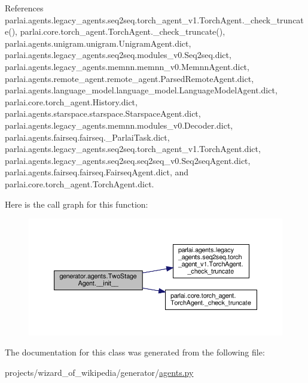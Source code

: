 References parlai.\+agents.\+legacy\+\_\+agents.\+seq2seq.\+torch\+\_\+agent\+\_\+v1.\+Torch\+Agent.\+\_\+check\+\_\+truncate(), parlai.\+core.\+torch\+\_\+agent.\+Torch\+Agent.\+\_\+check\+\_\+truncate(), parlai.\+agents.\+unigram.\+unigram.\+Unigram\+Agent.\+dict, parlai.\+agents.\+legacy\+\_\+agents.\+seq2seq.\+modules\+\_\+v0.\+Seq2seq.\+dict, parlai.\+agents.\+legacy\+\_\+agents.\+memnn.\+memnn\+\_\+v0.\+Memnn\+Agent.\+dict, parlai.\+agents.\+remote\+\_\+agent.\+remote\+\_\+agent.\+Parsed\+Remote\+Agent.\+dict, parlai.\+agents.\+language\+\_\+model.\+language\+\_\+model.\+Language\+Model\+Agent.\+dict, parlai.\+core.\+torch\+\_\+agent.\+History.\+dict, parlai.\+agents.\+starspace.\+starspace.\+Starspace\+Agent.\+dict, parlai.\+agents.\+legacy\+\_\+agents.\+memnn.\+modules\+\_\+v0.\+Decoder.\+dict, parlai.\+agents.\+fairseq.\+fairseq.\+\_\+\+Parlai\+Task.\+dict, parlai.\+agents.\+legacy\+\_\+agents.\+seq2seq.\+torch\+\_\+agent\+\_\+v1.\+Torch\+Agent.\+dict, parlai.\+agents.\+legacy\+\_\+agents.\+seq2seq.\+seq2seq\+\_\+v0.\+Seq2seq\+Agent.\+dict, parlai.\+agents.\+fairseq.\+fairseq.\+Fairseq\+Agent.\+dict, and parlai.\+core.\+torch\+\_\+agent.\+Torch\+Agent.\+dict.

Here is the call graph for this function\+:
\nopagebreak
\begin{figure}[H]
\begin{center}
\leavevmode
\includegraphics[width=350pt]{classgenerator_1_1agents_1_1TwoStageAgent_ac7d1af4e6371e79f58eb0449b557d87d_cgraph}
\end{center}
\end{figure}


The documentation for this class was generated from the following file\+:\begin{DoxyCompactItemize}
\item 
projects/wizard\+\_\+of\+\_\+wikipedia/generator/\hyperlink{projects_2wizard__of__wikipedia_2generator_2agents_8py}{agents.\+py}\end{DoxyCompactItemize}
